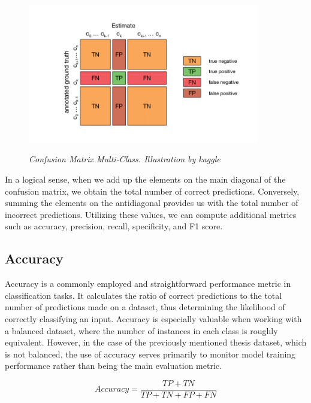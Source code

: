 \begin{figure}[H]
  \begin{adjustbox}{trim={0pt 0.5cm 0pt 1cm}, clip}
    \centering
    \includegraphics[width=0.9\textwidth]{imatges/preliminaries/confusion-matrix.png}
  \end{adjustbox}
  \caption[Confusion Matrix Multi-Class]{\textit{Confusion Matrix Multi-Class. Illustration by kaggle}}
  {\label{fig:confusion-matrix}}
\end{figure}

In a logical sense, when we add up the elements on the main diagonal of the
confusion matrix, we obtain the total number of correct predictions.
Conversely, summing the elements on the antidiagonal provides us with the total
number of incorrect predictions. Utilizing these values, we can compute
additional metrics such as accuracy, precision, recall, specificity, and F1
score.

\subsection{Accuracy}

Accuracy is a commonly employed and straightforward performance metric in
classification tasks. It calculates the ratio of correct predictions to the
total number of predictions made on a dataset, thus determining the likelihood
of correctly classifying an input. Accuracy is especially valuable when working
with a balanced dataset, where the number of instances in each class is roughly
equivalent. However, in the case of the previously mentioned thesis dataset,
which is not balanced, the use of accuracy serves primarily to monitor model
training performance rather than being the main evaluation metric.

\[Accuracy = \frac{TP + TN}{TP + TN + FP + FN}\]

